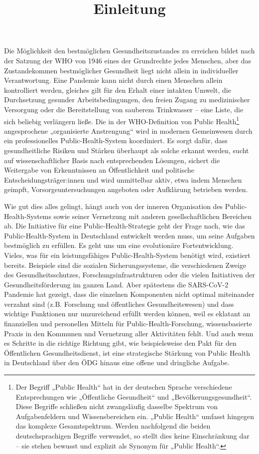 \documentclass{article}
\begin{document}
\title{Einleitung}

\maketitle


Die Möglichkeit den bestmöglichen Gesundheitszustandes zu erreichen bildet nach der Satzung der WHO von 1946 eines der Grundrechte jedes Menschen, aber das Zustandekommen bestmöglicher Gesundheit liegt nicht allein in individueller Verantwortung. Eine Pandemie kann nicht durch einen Menschen allein kontrolliert werden, gleiches gilt für den Erhalt einer intakten Umwelt, die Durchsetzung gesunder Arbeitsbedingungen, den freien Zugang zu medizinischer Versorgung oder die Bereitstellung von sauberem Trinkwasser – eine Liste, die sich beliebig verlängern ließe. Die in der WHO-Definition von Public Health\footnote{Der Begriff „Public Health“ hat in der deutschen Sprache verschiedene Entsprechungen wie „Öffentliche Gesundheit“ und „Bevölkerungsgesundheit“. Diese Begriffe schließen nicht zwangsläufig dasselbe Spektrum von Aufgabenfeldern und Wissensbereichen ein. „Public Health“ umfasst hingegen das komplexe Gesamtspektrum. Werden nachfolgend die beiden deutschsprachigen Begriffe verwendet, so stellt dies keine Einschränkung dar – sie stehen bewusst und explizit als Synonym für „Public Health“.} angesprochene „organisierte Anstrengung“ wird in modernen Gemeinwesen durch ein professionelles Public-Health-System koordiniert. Es sorgt dafür, dass gesundheitliche Risiken und Stärken überhaupt als solche erkannt werden, sucht auf wissenschaftlicher Basis nach entsprechenden Lösungen, sichert die Weitergabe von Erkenntnissen an Öffentlichkeit und politische Entscheidungsträger:innen und wird unmittelbar aktiv, etwa indem Menschen geimpft, Vorsorgeuntersuchungen angeboten oder Aufklärung betrieben werden.


Wie gut dies alles gelingt, hängt auch von der inneren Organisation des Public-Health-Systems sowie seiner Vernetzung mit anderen gesellschaftlichen Bereichen ab. Die Initiative für eine Public-Health-Strategie geht der Frage nach, wie das Public-Health-System in Deutschland entwickelt werden muss, um seine Aufgaben bestmöglich zu erfüllen. Es geht uns um eine evolutionäre Fortentwicklung. Vieles, was für ein leistungsfähiges Public-Health-System benötigt wird, existiert bereits. Beispiele sind die sozialen Sicherungssysteme, die verschiedenen Zweige des Gesundheitsschutzes, Forschungsinfrastrukturen oder die vielen Initiativen der Gesundheitsförderung im ganzen Land. Aber spätestens die SARS-CoV-2 Pandemie hat gezeigt, dass die einzelnen Komponenten nicht optimal miteinander verzahnt sind (z.B. Forschung und öffentliches Gesundheitswesen) und dass wichtige Funktionen nur unzureichend erfüllt werden können, weil es eklatant an finanziellen und personellen Mitteln für Public-Health-Forschung, wissensbasierte Praxis in den Kommunen und Vernetzung aller Aktivitäten fehlt. Und auch wenn es Schritte in die richtige Richtung gibt, wie beispielsweise den Pakt für den Öffentlichen Gesundheitsdienst, ist eine strategische Stärkung von Public Health in Deutschland über den ÖDG hinaus eine offene und dringliche Aufgabe.
\end{document}
